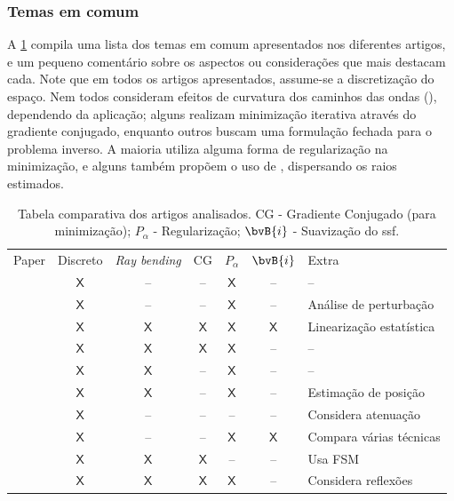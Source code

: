 \subsubsection*{Temas em comum}
%
\def\X{\ensuremath{\mathsf{X}}}
%
A \cref{table:fttt_revisao_temas} compila uma lista dos temas em comum apresentados nos diferentes artigos, e um pequeno comentário sobre os aspectos ou considerações que mais destacam cada. Note que em todos os artigos apresentados, assume-se a discretização do espaço. Nem todos consideram efeitos de curvatura dos caminhos das ondas (), dependendo da aplicação; alguns realizam minimização iterativa através do gradiente conjugado, enquanto outros buscam uma formulação fechada para o problema inverso. A maioria utiliza alguma forma de regularização na minimização, e alguns também propõem o uso de , dispersando os raios estimados.

\begin{table}[!t]\small\centering
	\caption{Tabela comparativa dos artigos analisados. CG - Gradiente Conjugado (para minimização); $P_{\alpha}$ - Regularização; $\bvB{i}$ - Suavização do \gls{ssf}.}
	\label{table:fttt_revisao_temas}
	\begin{tabular}{l c c c c c l}
		Paper 								& Discreto 	& \textsl{Ray bending} 	& CG 	& $P_{\alpha}$ 	& $\bvB{i}$ & Extra 	\\
		\cite{aki_determination_1976} 		& \X 		& -- 			& --	& \X			& --		& --		\\
		\cite{aki_determination_1977} 		& \X 		& -- 			& --	& \X			& --		& Análise de perturbação		\\
		\cite{ali_opensource_2019}			& \X		& \X			& \X	& \X			& \X		& Linearização estatística \\
		\cite{hormati_robust_2010}			& \X 		& \X			& \X	& \X			& --		& --		\\
		\cite{jeong_investigating_2024}	& \X		& \X			& --	& \X			& --		& --		\\
		\cite{hellmann_borehole_2023}		& \X		& \X			& --	& \X			& --		& Estimação de posição	\\
		\cite{dines_computerized_1979}		& \X		& --			& --	& --			& --		& Considera atenuação\\
		\cite{phillips_traveltime_1991}	& \X		& --			& --	& \X			& \X		& Compara várias técnicas	\\
		\cite{tang_travel_2024}			& \X		& \X			& \X	& --			& --		& Usa FSM \\
		\cite{zhang_inversion_2016}		& \X		& \X			& \X	& \X			& --		& Considera reflexões			
	\end{tabular}
\end{table}

